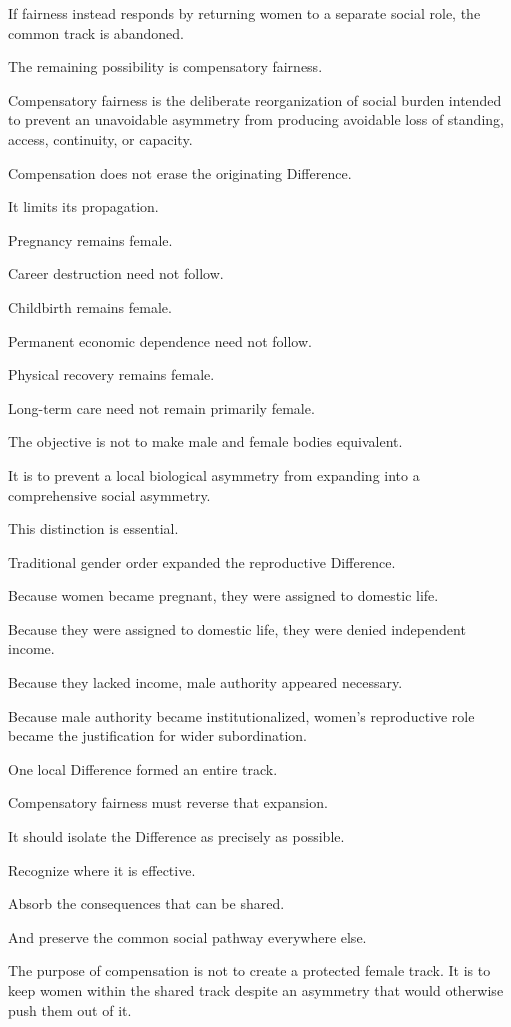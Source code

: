 If fairness instead responds by returning women to a separate social role, the common track is abandoned.

The remaining possibility is compensatory fairness.

Compensatory fairness is the deliberate reorganization of social burden intended to prevent an unavoidable asymmetry from producing avoidable loss of standing, access, continuity, or capacity.

Compensation does not erase the originating Difference.

It limits its propagation.

Pregnancy remains female.

Career destruction need not follow.

Childbirth remains female.

Permanent economic dependence need not follow.

Physical recovery remains female.

Long-term care need not remain primarily female.

The objective is not to make male and female bodies equivalent.

It is to prevent a local biological asymmetry from expanding into a comprehensive social asymmetry.

This distinction is essential.

Traditional gender order expanded the reproductive Difference.

Because women became pregnant, they were assigned to domestic life.

Because they were assigned to domestic life, they were denied independent income.

Because they lacked income, male authority appeared necessary.

Because male authority became institutionalized, women’s reproductive role became the justification for wider subordination.

One local Difference formed an entire track.

Compensatory fairness must reverse that expansion.

It should isolate the Difference as precisely as possible.

Recognize where it is effective.

Absorb the consequences that can be shared.

And preserve the common social pathway everywhere else.

The purpose of compensation is not to create a protected female track. It is to keep women within the shared track despite an asymmetry that would otherwise push them out of it.

